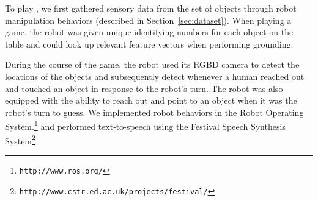 To play \ispy, we first gathered sensory data from the set of objects through robot manipulation behaviors (described in Section~\ref{sec:dataset}).
When playing a game, the robot was given unique identifying numbers for each object on the table and could look up relevant feature vectors when performing grounding.

During the course of the game, the robot used its RGBD camera to detect the locations of the objects and subsequently detect whenever a human reached out and touched an object in response to the robot's turn.
The robot was also equipped with the ability to reach out and point to an object when it was the robot's turn to guess.
We implemented robot behaviors in the Robot Operating System.\footnote{\texttt{http://www.ros.org/}} and performed text-to-speech using the Festival Speech Synthesis System\footnote{\texttt{http://www.cstr.ed.ac.uk/projects/festival/}}